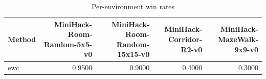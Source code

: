 \begin{table}[htbp]
\centering
\caption{Per-environment win rates}
\label{tab:per-env}
\begin{tabular}{lrrrr}
\toprule
\textbf{Method} & \textbf{MiniHack-Room-Random-5x5-v0} & \textbf{MiniHack-Room-Random-15x15-v0} & \textbf{MiniHack-Corridor-R2-v0} & \textbf{MiniHack-MazeWalk-9x9-v0} \\
\midrule
ewc & 0.9500 & 0.9000 & 0.4000 & 0.3000 \\
\bottomrule
\end{tabular}
\end{table}